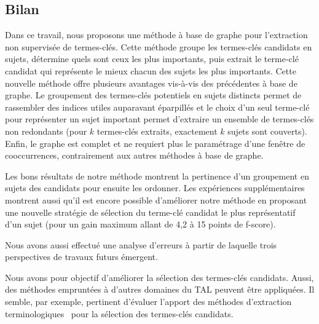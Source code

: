       \subsection{Bilan}
      \label{subsec:main-automatic_keyphrase_annotation-unsupervised_automatic_keyphrase_extraction-bilan}
        Dans ce travail, nous proposons une méthode à base de graphe pour
        l'extraction non supervisée de termes-clés. Cette méthode groupe les
        termes-clés candidats en sujets, détermine quels sont ceux les plus
        importants, puis extrait le terme-clé candidat qui représente le mieux
        chacun des sujets les plus importants. Cette nouvelle méthode offre
        plusieurs avantages vis-à-vis des précédentes à base de graphe. Le
        groupement des termes-clés potentiels en sujets distincts permet de
        rassembler des indices utiles auparavant éparpillés et le choix d'un
        seul terme-clé pour représenter un sujet important permet d'extraire un
        ensemble de termes-clés non redondants (pour $k$ termes-clés extraits,
        exactement $k$ sujets sont couverts). Enfin, le graphe est complet et ne
        requiert plus le paramétrage d'une fenêtre de cooccurrences,
        contrairement aux autres méthodes à base de graphe.

        Les bons résultats de notre méthode montrent la pertinence d'un
        groupement en sujets des candidats pour ensuite les ordonner. Les
        expériences supplémentaires montrent aussi qu'il est encore possible
        d'améliorer notre méthode en proposant une nouvelle stratégie de
        sélection du terme-clé candidat le plus représentatif d'un sujet (pour
        un gain maximum allant de 4,2 à 15 points de f-score).

        Nous avons aussi effectué une analyse d'erreurs à partir de laquelle
        trois perspectives de travaux futurs émergent.

        Nous avons pour objectif d'améliorer la sélection des termes-clés
        candidats. Aussi, des méthodes empruntées à d'autres domaines du TAL
        peuvent être appliquées. Il semble, par exemple, pertinent d'évaluer
        l'apport des méthodes d'extraction
        terminologiques~\cite{castellvi2001automatictermdetection} pour la
        sélection des termes-clés candidats.
        
